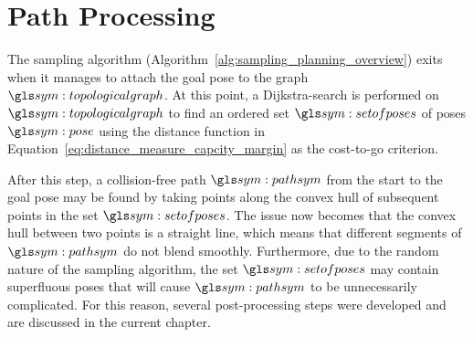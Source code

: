 \chapter{Path Processing}%
\label{chap:path_processing}

	The sampling algorithm (Algorithm~\ref{alg:sampling_planning_overview})
	exits when it manages to attach the goal pose to the graph
	$\topologicalgraph$. At this point, a Dijkstra-search is performed on
	$\topologicalgraph$ to find an ordered set $\setofposes$ of poses $\pose$
	using the distance function in
	Equation~\ref{eq:distance_measure_capcity_margin} as the cost-to-go
	criterion.

	After this step, a collision-free path $\pathsym$ from the start to the goal
	pose may be found by taking points along the convex hull of subsequent
	points in the set $\setofposes$. The issue now becomes that the convex hull
	between two points is a straight line, which means that different segments
	of $\pathsym$ do not blend smoothly. Furthermore, due to the random nature
	of the sampling algorithm, the set $\setofposes$ may contain superfluous
	poses that will cause $\pathsym$ to be unnecessarily complicated. For this
	reason, several post-processing steps were developed and are discussed in
	the current chapter.

	
	
	
